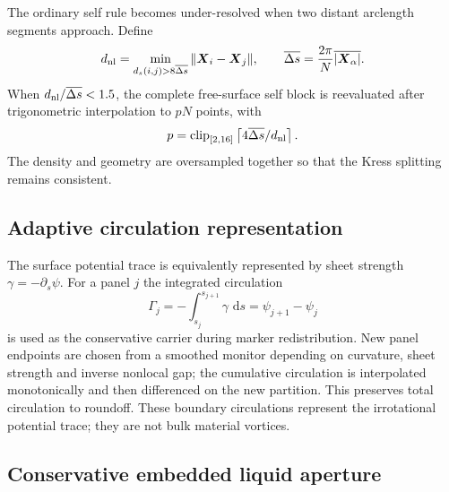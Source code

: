\documentclass[11pt]{article}
\newcommand{\dd}{\,\mathrm{d}}
\begin{document}
The ordinary self rule becomes under-resolved when two distant arclength
segments approach.  Define
\begin{equation}
d_{\rm nl}=\min_{d_s(i,j)>8\overline{\Delta s}}
\|\boldsymbol X_i-\boldsymbol X_j\|,
\qquad
\overline{\Delta s}=\frac{2\pi}{N}\overline{|\boldsymbol X_\alpha|}.
\end{equation}
When $d_{\rm nl}/\overline{\Delta s}<1.5$, the complete free-surface
self block is reevaluated after trigonometric interpolation to $pN$ points,
with
\begin{equation}
p=\operatorname{clip}_{[2,16]}
\left\lceil4\overline{\Delta s}/d_{\rm nl}\right\rceil.
\end{equation}
The density and geometry are oversampled together so that the Kress splitting
remains consistent.

\subsection{Adaptive circulation representation}

The surface potential trace is equivalently represented by sheet strength
$\gamma=-\partial_s\psi$.  For a panel $j$ the integrated circulation
\begin{equation}
 \Gamma_j=-\int_{s_j}^{s_{j+1}}\gamma\,\dd s
          =\psi_{j+1}-\psi_j
 \label{eq:panel-circulation}
\end{equation}
is used as the conservative carrier during marker redistribution.  New panel
endpoints are chosen from a smoothed monitor depending on curvature, sheet
strength and inverse nonlocal gap; the cumulative circulation is interpolated
monotonically and then differenced on the new partition.  This preserves total
circulation to roundoff.  These boundary circulations represent the
irrotational potential trace; they are not bulk material vortices.

\subsection{Conservative embedded liquid aperture}
\end{document}
